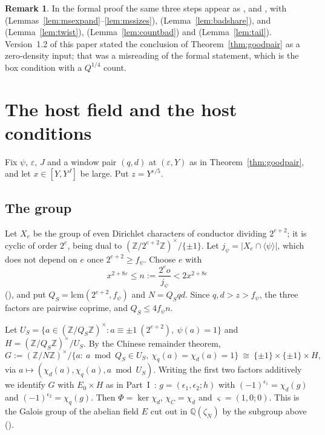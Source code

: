 \documentclass[11pt]{amsart}
\newcommand{\Z}{\mathbb{Z}}
\newcommand{\Q}{\mathbb{Q}}
\newcommand{\eps}{\varepsilon}
\theoremstyle{plain}
\theoremstyle{definition}
\newtheorem{remark}[theorem]{Remark}
\numberwithin{equation}{section}
\begin{document}
\begin{remark}
In the formal proof the same three steps appear as ,  and
, with  (Lemmas~\ref{lem:msexpand}--\ref{lem:mssizes}),
 (Lemma~\ref{lem:badshare}),  and 
(Lemma~\ref{lem:twist}),  (Lemma~\ref{lem:countbad}) and 
(Lemma~\ref{lem:tail}). Version~1.2 of this paper stated the conclusion of
Theorem~\ref{thm:goodpair} as a zero-density input; that was a misreading of the formal
statement, which is the box condition with a $Q^{1/4}$ count.
\end{remark}

\section{The host field and the host conditions}\label{sec:hostfield}

Fix $\psi$, $\eps$, $J$ and a window pair $(q,d)$ at $(\eps,Y)$ as in Theorem~\ref{thm:goodpair},
and let $x\in[Y,Y^J]$ be large. Put $z=Y^{\eps/5}$.

\subsection{The group}

Let $X_e$ be the group of even Dirichlet characters of conductor dividing $2^{e+2}$; it is cyclic
of order $2^e$, being dual to $(\Z/2^{e+2}\Z)^\times/\{\pm1\}$. Let $j_\psi=|X_e\cap\langle\psi\rangle|$,
which does not depend on $e$ once $2^{e+2}\ge f_\psi$. Choose $e$ with
\[
x^{2+8\eps}\le n:=\frac{2^eo}{j_\psi}<2x^{2+8\eps}
\]
(), and put $Q_S=\mathrm{lcm}(2^{e+2},f_\psi)$ and $N=Q_Sqd$. Since $q,d>z>f_\psi$, the
three factors are pairwise coprime, and $Q_S\le4f_\psi n$.

Let $U_S=\{a\in(\Z/Q_S\Z)^\times:a\equiv\pm1\ (2^{e+2}),\ \psi(a)=1\}$ and
$H=(\Z/Q_S\Z)^\times/U_S$. By the Chinese remainder theorem,
\[
G:=(\Z/N\Z)^\times/\{a:\ a\bmod Q_S\in U_S,\ \chi_q(a)=\chi_d(a)=1\}\ \cong\ \{\pm1\}\times\{\pm1\}\times H,
\]
via $a\mapsto(\chi_d(a),\chi_q(a),a\bmod U_S)$. Writing the first two factors additively we identify
$G$ with $E_0\times H$ as in Part~I~\cite[\S4]{dixit-part1}: $g=(\epsilon_1,\epsilon_2;h)$ with
$(-1)^{\epsilon_1}=\chi_d(g)$ and $(-1)^{\epsilon_2}=\chi_q(g)$. Then $\Phi=\ker\chi_d$,
$\chi_C=\chi_d$ and $\varsigma=(1,0;0)$. This is the Galois group of the abelian field $E$ cut out
in $\Q(\zeta_N)$ by the subgroup above ().
\end{document}
